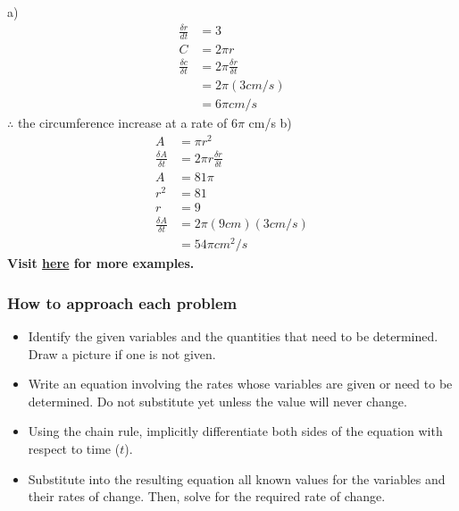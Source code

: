 \documentclass{article}
\begin{document}
a) 
\begin{align*}
    \frac{\delta r}{dt}&=3\\
    C&=2\pi r\\
    \frac{\delta c }{\delta t}&=2 \pi \frac{\delta r}{\delta t}\\
    &=2 \pi (3cm/s)\\
    &=6 \pi cm/s 
\end{align*}
$\therefore$ the circumference increase at a rate of $6 \pi$ cm/s
b) 
\begin{align*}
    A&=\pi r^2\\
    \frac{\delta A}{\delta t} &=2\pi r \frac{\delta r}{\delta t}\\
    A&=81 \pi \\
    r^2&=81\\
    r&=9\\
    \frac{\delta A}{\delta t}&=2\pi (9 cm)(3cm/s)\\
    &=54\pi cm^2/s
\end{align*}
\textbf{Visit \href{https://openstax.org/books/calculus-volume-1/pages/4-1-related-rates}{here} for more examples.}

 
\subsubsection{How to approach each problem}
\begin{itemize}
    \item Identify the given variables and the quantities that need to be determined. Draw a picture if one is not given.

    \item Write an equation involving the rates whose variables are given or need to be determined. Do not substitute yet unless the value will never change.

    \item Using the chain rule, implicitly differentiate both sides of the equation with respect to time ($t$).

    \item Substitute into the resulting equation all known values for the variables and their rates of change. Then, solve for the required rate of change.	
\end{itemize}
	
\end{document}
